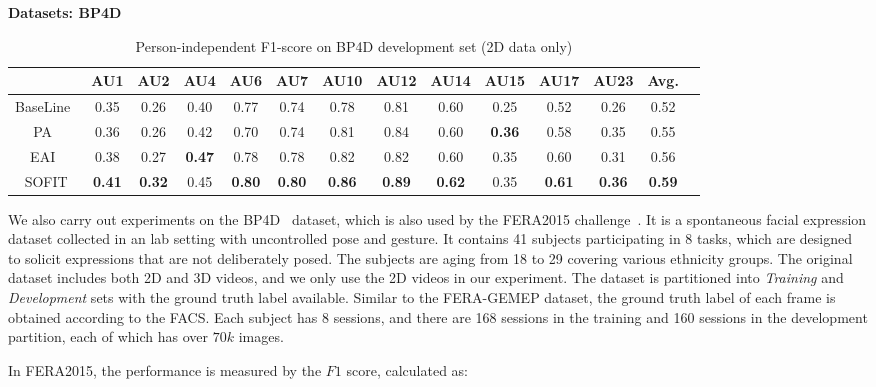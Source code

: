 \documentclass[10pt,journal]{IEEEtran}
\begin{document}
\noindent \textbf{Datasets: BP4D}


\begin{table}[htbp]
\caption{Person-independent F1-score on BP4D development set (2D data only)}
\begin{center}
\label{table:bp}
\begin{tabular}{cccccccccccccc}
\toprule
& AU1 & AU2 & AU4 & AU6 & AU7 & AU10 & AU12 & AU14 & AU15 & AU17 & AU23 & Avg.	\\ 
\midrule
BaseLine~\cite{FERA15}	&0.35	&0.26	&0.40	&0.77	&0.74	&0.78	&0.81	&0.60	&0.25	&0.52	&0.26	&0.52 \\
PA~\cite{Tadas_ECCV14}					&0.36	&0.26	&0.42	&0.70	&0.74	&0.81	&0.84	&0.60	&\textbf{0.36}\cellcolor[gray]{0.9}	&0.58	&0.35	&0.55 \\
EAI~\cite{Yang_SMCB12}					&0.38	&0.27	&\textbf{0.47}\cellcolor[gray]{0.9}	&0.78	&0.78	&0.82	&0.82	&0.60	&0.35	&0.60	&0.31	&0.56 \\
SOFIT														&\textbf{0.41}\cellcolor[gray]{0.9}	&\textbf{0.32}\cellcolor[gray]{0.9}	&0.45	&\textbf{0.80}\cellcolor[gray]{0.9}	&\textbf{0.80}\cellcolor[gray]{0.9}	&\textbf{0.86}\cellcolor[gray]{0.9}	&\textbf{0.89}\cellcolor[gray]{0.9}	&\textbf{0.62}\cellcolor[gray]{0.9}	&0.35	&\textbf{0.61}\cellcolor[gray]{0.9}	&\textbf{0.36}\cellcolor[gray]{0.9}	&\textbf{0.59}\cellcolor[gray]{0.9} \\
\bottomrule
\end{tabular}
\end{center}
\end{table}


We also carry out experiments on the BP4D~\cite{BP4D} dataset, which is also used by the FERA2015 challenge~\cite{FERA15}. It is a spontaneous facial expression dataset collected in an lab setting with uncontrolled pose and gesture. It contains 41 subjects participating in 8 tasks, which are designed to solicit expressions that are not deliberately posed. The subjects are aging from 18 to 29 covering various ethnicity groups. The original dataset includes both 2D and 3D videos, and we only use the 2D videos in our experiment. The dataset is partitioned into \textit{Training} and \textit{Development} sets with the ground truth label available. Similar to the FERA-GEMEP dataset, the ground truth label of each frame is obtained according to the FACS. Each subject has 8 sessions, and there are 168 sessions in the training and 160 sessions in the development partition, each of which has over $70k$ images.

In FERA2015, the performance is measured by the $F1$ score, calculated as:
\end{document}
